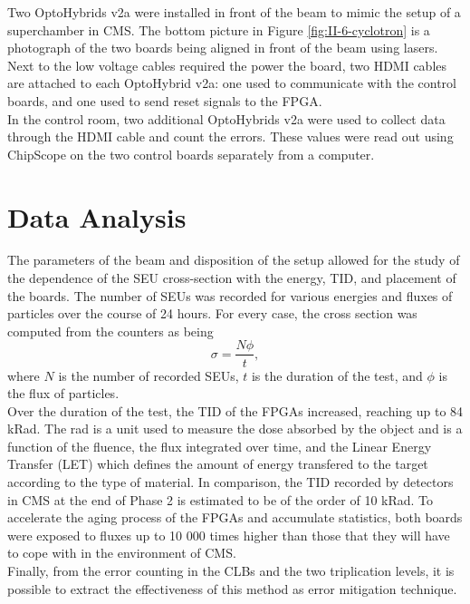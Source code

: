     Two OptoHybrids v2a were installed in front of the beam to mimic the setup of a superchamber in CMS. The bottom picture in Figure \ref{fig:II-6-cyclotron} is a photograph of the two boards being aligned in front of the beam using lasers. Next to the low voltage cables required the power the board, two HDMI cables are attached to each OptoHybrid v2a: one used to communicate with the control boards, and one used to send reset signals to the FPGA. \\

    In the control room, two additional OptoHybrids v2a were used to collect data through the HDMI cable and count the errors. These values were read out using ChipScope on the two control boards separately from a computer.

  \section{Data Analysis}

    The parameters of the beam and disposition of the setup allowed for the study of the dependence of the SEU cross-section with the energy, TID, and placement of the boards. The number of SEUs was recorded for various energies and fluxes of particles over the course of 24 hours. For every case, the cross section was computed from the counters as being
    \begin{equation}
        \sigma = \frac{N \phi}{t} ,
    \end{equation}
    where $ N $ is the number of recorded SEUs, $ t $ is the duration of the test, and $ \phi $ is the flux of particles. \\

    Over the duration of the test, the TID of the FPGAs increased, reaching up to 84 kRad. The rad is a unit used to measure the dose absorbed by the object and is a function of the fluence, the flux integrated over time, and the Linear Energy Transfer (LET) which defines the amount of energy transfered to the target according to the type of material. In comparison, the TID recorded by detectors in CMS at the end of Phase 2 is estimated to be of the order of 10 kRad. To accelerate the aging process of the FPGAs and accumulate statistics, both boards were exposed to fluxes up to 10 000 times higher than those that they will have to cope with in the environment of CMS. \\

    Finally, from the error counting in the CLBs and the two triplication levels, it is possible to extract the effectiveness of this method as error mitigation technique.

